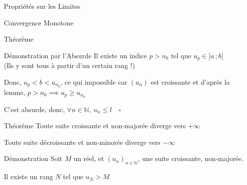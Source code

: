 \documentclass{cours}
\begin{document}
\begin{Gpartie}{Propriétés sur les Limites}
\begin{Spartie}{Convergence Monotone}
\begin{SSpartie}{Théorème}
\begin{SSSpartie}{Démonstration par l'Absurde}
                    Il existe un indice $p>n_0$ tel que $u_p\in\big]a\,;b\big[$ \\ (Ils y sont tous à partir d'un certain rang !)

                    Donc, $u_p<b<u_{n_0}$, ce qui impossible car $(u_n)$ est croissante et d'après la lemme, $p>n_0\implies u_p\geq u_{n_0}$

                    C'est absurde, donc, $\forall n\in\mathbb{N},\ u_n\leq l\quad\square$
                \end{SSSpartie}
            \end{SSpartie}
            \pagebreak
            \begin{SSpartie}{Théorème} 
                Toute suite croissante et non-majorée diverge vers $+\infty$

                Toute suite décroissante et non-minorée diverge vers $-\infty$

                \begin{SSSpartie}{Démonstration} 
                    Soit $M$ un réel, et $(u_n)_{n\in\mathbb{N}}$, une suite croissante, non-majorée.

                    Il existe un rang $N$ tel que $u_N>M$


\end{SSSpartie}
\end{SSpartie}
\end{Spartie}
\end{Gpartie}
\end{document}
